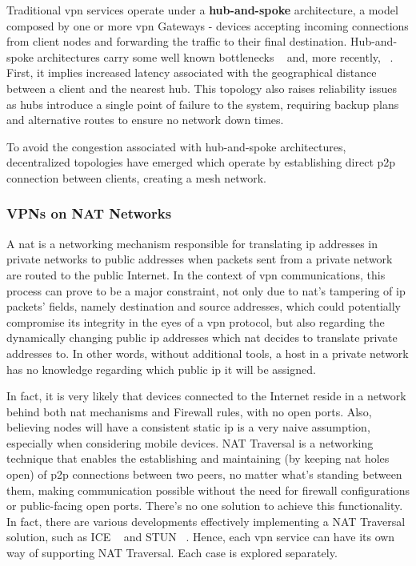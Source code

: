 \documentclass[11pt,twoside,a4paper]{report}
\begin{document}
Traditional \ac{vpn} services operate under a \textbf{hub-and-spoke} architecture, a model composed by one or more \ac{vpn} Gateways - devices accepting incoming connections from client nodes and forwarding the traffic to their final destination. Hub-and-spoke architectures carry some well known bottlenecks ~\cite{ELHEDHLI20051615, o1998geographer} and, more recently, ~\cite{AN2015103}. First, it implies increased latency associated with the geographical distance between a client and the nearest hub. This topology also raises reliability issues as hubs introduce a single point of failure to the system, requiring backup plans and alternative routes to ensure no network down times.

To avoid the congestion associated with hub-and-spoke architectures, decentralized topologies have emerged which operate by establishing direct \ac{p2p} connection between clients, creating a mesh network.
\fi

\subsubsection{VPNs on NAT Networks}
\label{ss:nat-t}

A \ac{nat} is a networking mechanism responsible for translating \ac{ip} addresses in private networks to public addresses when packets sent from a private network are routed to the public Internet. In the context of \ac{vpn} communications, this process can prove to be a major constraint, not only due to \ac{nat}'s tampering of \ac{ip} packets' fields, namely destination and source addresses, which could potentially compromise its integrity in the eyes of a \ac{vpn} protocol, but also regarding the dynamically changing public \ac{ip} addresses which \ac{nat} decides to translate private addresses to. In other words, without additional tools, a host in a private network has no knowledge regarding which public \ac{ip} it will be assigned.

In fact, it is very likely that devices connected to the Internet reside in a network behind both \ac{nat} mechanisms and Firewall rules, with no open ports. Also, believing nodes will have a consistent static \ac{ip} is a very naive assumption, especially when considering mobile devices. NAT Traversal is a networking technique that enables the establishing and maintaining (by keeping \ac{nat} holes open) of \ac{p2p} connections between two peers, no matter what's standing between them, making communication possible without the need for firewall configurations or public-facing open ports. There's no one solution to achieve this functionality. In fact, there are various developments effectively implementing a NAT Traversal solution, such as ICE ~\cite{rfc8445} and STUN ~\cite{rfc8489}. Hence, each \ac{vpn} service can have its own way of supporting NAT Traversal. Each case is explored separately.
\end{document}

